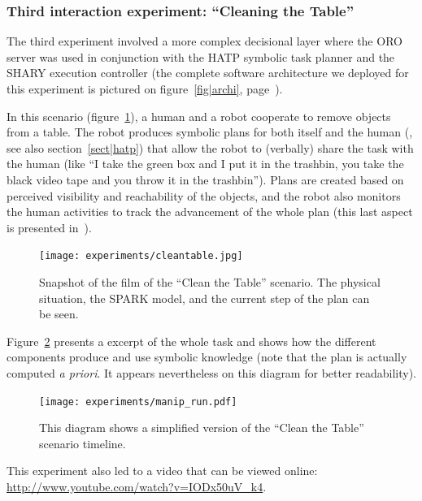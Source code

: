 \subsubsection{Third interaction experiment: ``Cleaning the Table''}
\label{sect|expe3}

The third experiment involved a more complex decisional layer where the ORO
server was used in conjunction with the HATP symbolic task planner and the
SHARY execution controller (the complete software architecture we deployed for
this experiment is pictured on figure~\ref{fig|archi},
page~\pageref{fig|archi}).

In this scenario (figure~\ref{fig|cleantable-video}), a human and a robot
cooperate to remove objects from a table. The robot produces symbolic plans for
both itself and the human (\cite{Alami2011}, see also section~\ref{sect|hatp})
that allow the robot to (verbally) share the task with the human (like ``I take
the green box and I put it in the trashbin, you take the black video tape and
you throw it in the trashbin''). Plans are created based on perceived
visibility and reachability of the objects, and the robot also monitors the
human activities to track the advancement of the whole plan (this last aspect
is presented in~\cite{Warnier2012}).

\begin{figure}
    \centering
    \texttt{[image: experiments/cleantable.jpg]}

    \caption{Snapshot of the film of the ``Clean the Table'' scenario. The
    physical situation, the SPARK model, and the current step of the plan can
    be seen.}

    \label{fig|cleantable-video}
\end{figure}


Figure~\ref{fig|cleantable-timeline} presents a excerpt of the whole task and
shows how the different components produce and use symbolic knowledge (note
that the plan is actually computed {\it a priori}. It appears nevertheless on
this diagram for better readability).

\begin{figure}
    \centering
    \texttt{[image: experiments/manip\_run.pdf]}

    \caption{This diagram shows a simplified version of the ``Clean the Table'' scenario timeline.}

    \label{fig|cleantable-timeline}
\end{figure}


This experiment also led to a video that can be viewed online:
\url{http://www.youtube.com/watch?v=IODx50uV_k4}.


